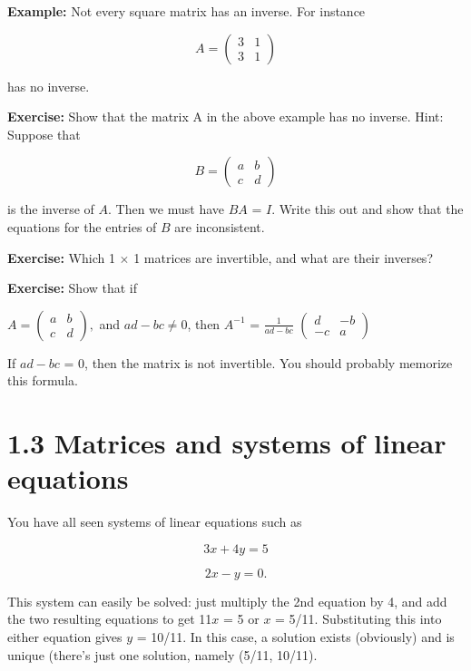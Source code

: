 \documentclass{book}
\begin{document}
\begin{itemize}
	\textbf{Example:} Not every square matrix has an inverse. For instance

$$ A = \begin{pmatrix}3 & 1 \\ 3 & 1 \end{pmatrix} $$


has no inverse.

\textbf{Exercise:} Show that the matrix A in the above example has no inverse. Hint: Suppose that

$$ B = \begin{pmatrix} a & b \\ c & d \end{pmatrix} $$

is the inverse of $A$. Then we must have $BA$ = $I$. Write this out and show that the equations for the entries of $B$ are inconsistent.

\textbf{Exercise:} Which 1 $\times$ 1 matrices are invertible, and what are their inverses?

\textbf{Exercise:} Show that if

$ A = \begin{pmatrix} a & b \\ c & d \end{pmatrix},$ and $ad - bc \neq 0 $, then $A^{-1}$ = $\frac{1}{ad -bc} $ $\begin{pmatrix}d & -b \\ -c & a \end{pmatrix}$

If $ad - bc$ = 0, then the matrix is not invertible. You should probably memorize this formula.
\end{itemize}


\section*{1.3 Matrices and systems of linear equations}

You have all seen systems of linear equations such as


\begin{equation} \label{eq1} 
3x + 4y = 5
\end{equation} 


\begin{equation} \label{eq2} 
2x - y = 0.
\end{equation} 

This system can easily be solved: just multiply the 2nd equation by 4, and add the two resulting equations to get 11$x$ = 5 or $x$ = 5/11. Substituting this into either equation gives $y$ = 10/11. In this case, a solution exists (obviously) and is unique (there\rq s just one solution, namely (5/11, 10/11).
\end{document}
